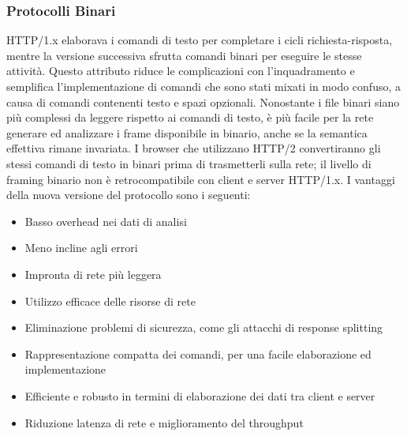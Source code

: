 \documentclass[a4paper,11pt]{article}
\begin{document}
\subsubsection{Protocolli Binari}
HTTP/1.x elaborava i comandi di testo per completare i cicli richiesta-risposta, mentre la versione successiva sfrutta comandi binari per eseguire le stesse attività.\newline
Questo attributo riduce le complicazioni con l’inquadramento e semplifica l’implementazione di comandi che sono stati mixati in modo confuso, a causa di comandi contenenti testo e spazi opzionali.\newline
Nonostante i file binari siano più complessi da leggere rispetto ai comandi di testo, è più facile per la rete generare ed analizzare i frame disponibile in binario, anche se la semantica effettiva rimane invariata. I browser che utilizzano HTTP/2 convertiranno gli stessi comandi di testo in binari prima di trasmetterli sulla rete; il livello di framing binario non è retrocompatibile con client e server HTTP/1.x.\bigbreak
\noindent I vantaggi della nuova versione del protocollo sono i seguenti:
\begin{itemize}
    \item Basso overhead nei dati di analisi
    \item Meno incline agli errori
    \item Impronta di rete più leggera
    \item Utilizzo efficace delle risorse di rete
    \item Eliminazione problemi di sicurezza, come gli attacchi di response splitting
    \item Rappresentazione compatta dei comandi, per una facile elaborazione ed implementazione
    \item Efficiente e robusto in termini di elaborazione dei dati tra client e server
    \item Riduzione latenza di rete e miglioramento del throughput
\end{itemize}
\end{document}
